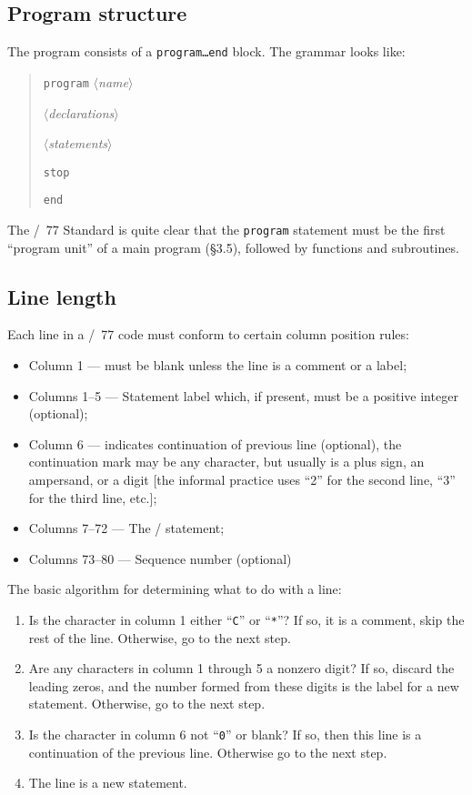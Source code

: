 \subsection{Program structure}
The program consists of a \texttt{program\dots end} block. The grammar
looks like:

\begin{quotation}
\noindent\texttt{program} $\langle$\textit{name\/}$\rangle$

$\langle$\textit{declarations\/}$\rangle$

$\langle$\textit{statements\/}$\rangle$

\noindent\texttt{stop}

\noindent\texttt{end}
\end{quotation}

The \FORTRAN/~77 Standard is quite clear that the \texttt{program}
statement must be the first ``program unit'' of a main program (\S3.5),
followed by functions and subroutines.

\subsection{Line length}
Each line in a \FORTRAN/~77 code must conform to certain column position
rules:
\begin{itemize}
\item Column 1 --- must be blank unless the line is a comment or a label;
\item Columns 1--5 --- Statement label which, if present, must be a
  positive integer (optional);
\item Column 6 --- indicates continuation of previous line (optional),
  the continuation mark may be any character, but usually is a plus
  sign, an ampersand, or a digit [the informal practice uses
  ``2'' for the second line, ``3'' for the third line, etc.];
\item Columns 7--72 --- The \FORTRAN/ statement;
\item Columns 73--80 --- Sequence number (optional)
\end{itemize}
The basic algorithm for determining what to do with a line:
\begin{enumerate}
\item Is the character in column 1 either ``\texttt{C}'' or
  ``\texttt{*}''? If so, it is a comment, skip the rest of the
  line. Otherwise, go to the next step.
\item Are any characters in column 1 through 5 a nonzero digit? If so,
  discard the leading zeros, and the number formed from these digits is
  the label for a new statement. Otherwise, go to the next step.
\item Is the character in column 6 not ``\texttt{0}'' or blank? If so,
  then this line is a continuation of the previous line. Otherwise go to
  the next step.
\item The line is a new statement.
\end{enumerate}

